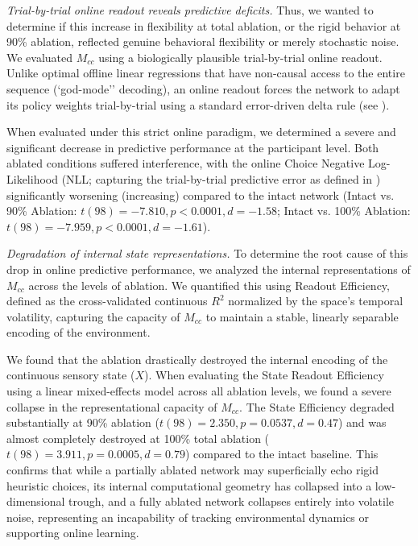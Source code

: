 \documentclass[12pt, a4paper]{extarticle}
\begin{document}
\textit{Trial-by-trial online readout reveals predictive deficits.}
Thus, we wanted to determine if this increase in flexibility at total ablation, or the rigid behavior at 90\% ablation, reflected genuine behavioral flexibility or merely stochastic noise. We evaluated $M_{cc}$ using a biologically plausible trial-by-trial online readout. Unlike optimal offline linear regressions that have non-causal access to the entire sequence (`god-mode'' decoding), an online readout forces the network to adapt its policy weights trial-by-trial using a standard error-driven delta rule (see ). 

When evaluated under this strict online paradigm, we determined a severe and significant decrease in predictive performance at the participant level. Both ablated conditions suffered interference, with the online Choice Negative Log-Likelihood (NLL; capturing the trial-by-trial predictive error as defined in ) significantly worsening (increasing) compared to the intact network (Intact vs. 90\% Ablation: $t(98) = -7.810, p < 0.0001, d = -1.58$; Intact vs. 100\% Ablation: $t(98) = -7.959, p < 0.0001, d = -1.61$).

\textit{Degradation of internal state representations.}
To determine the root cause of this drop in online predictive performance, we analyzed the internal representations of $M_{cc}$ across the levels of ablation. We quantified this using Readout Efficiency, defined as the cross-validated continuous $R^2$ normalized by the space's temporal volatility, capturing the capacity of $M_{cc}$ to maintain a stable, linearly separable encoding of the environment. 

We found that the ablation drastically destroyed the internal encoding of the continuous sensory state ($X$). When evaluating the State Readout Efficiency using a linear mixed-effects model across all ablation levels, we found a severe collapse in the representational capacity of $M_{cc}$. The State Efficiency degraded substantially at 90\% ablation ($t(98) = 2.350, p = 0.0537, d = 0.47$) and was almost completely destroyed at 100\% total ablation ($t(98) = 3.911, p = 0.0005, d = 0.79$) compared to the intact baseline. This confirms that while a partially ablated network may superficially echo rigid heuristic choices, its internal computational geometry has collapsed into a low-dimensional trough, and a fully ablated network collapses entirely into volatile noise, representing an incapability of tracking environmental dynamics or supporting online learning.
\end{document}
